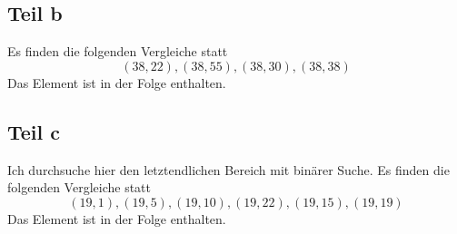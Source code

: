 \documentclass[10pt,a4paper]{article}
\begin{document}
\subsection{Teil b}
Es finden die folgenden Vergleiche statt
\begin{equation}
  (38, 22), (38, 55), (38, 30), (38, 38)
\end{equation}
Das Element ist in der Folge enthalten.

\subsection{Teil c}
Ich durchsuche hier den letztendlichen Bereich mit binärer Suche.
Es finden die folgenden Vergleiche statt
\begin{equation}
  (19, 1), (19, 5), (19, 10), (19, 22), (19, 15), (19, 19)
\end{equation}
Das Element ist in der Folge enthalten.
\end{document}
